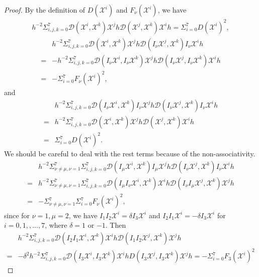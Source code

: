 \documentclass[10pt,a4paper]{amsart}
\numberwithin{equation}{section}
\begin{document}
\begin{proof}
By the definition of $D(\mathscr{X}^i)$ and $F_\nu(\mathscr{X}^i)$, we have
\begin{align*}
    h^{-2}\Sigma_{i,j,k=0}^7\mathcal{D}(\mathscr{X}^i,\mathscr{X}^k)\mathscr{X}^j h \mathcal{D}(\mathscr{X}^j,\mathscr{X}^k)\mathscr{X}^i h=\Sigma_{i=0}^7D(\mathscr{X}^i)^2,\end{align*}
\begin{align*}
    &h^{-2}\Sigma_{i,j,k=0}^7\mathcal{D}(\mathscr{X}^i,\mathscr{X}^k)\mathscr{X}^j h \mathcal{D}(I_\nu\mathscr{X}^j,\mathscr{X}^k)I_\nu\mathscr{X}^i h\\=&-h^{-2}\Sigma_{i,j,k=0}^7\mathcal{D}(I_\nu\mathscr{X}^i,I_\nu\mathscr{X}^k)\mathscr{X}^j h \mathcal{D}(I_\nu\mathscr{X}^j,I_\nu\mathscr{X}^k)\mathscr{X}^i h\\=&-\Sigma_{i=0}^7F_\nu(\mathscr{X}^i)^2,\end{align*}
and
\begin{align*}
    &h^{-2}\Sigma_{i,j,k=0}^7\mathcal{D}(I_\nu \mathscr{X}^i,\mathscr{X}^k)I_\nu\mathscr{X}^j h \mathcal{D}(I_\nu \mathscr{X}^j,\mathscr{X}^k)I_\nu\mathscr{X}^i h\\=& h^{-2}\Sigma_{i,j,k=0}^7\mathcal{D}(\mathscr{X}^i,\mathscr{X}^k)\mathscr{X}^j h \mathcal{D}(\mathscr{X}^j,\mathscr{X}^k)\mathscr{X}^i h\\=&\Sigma_{i=0}^7D(\mathscr{X}^i)^2.\end{align*}
We should be careful to deal with the rest terms because of the non-associativity.
\begin{align*}
    &h^{-2}\Sigma_{\nu\neq \mu,\nu=1}^7\Sigma_{i,j,k=0}^7\mathcal{D}(I_\mu \mathscr{X}^i,\mathscr{X}^k)I_\mu \mathscr{X}^j h \mathcal{D}(I_\nu\mathscr{X}^j,\mathscr{X}^k)I_\nu\mathscr{X}^i h\\=&h^{-2}\Sigma_{\nu\neq \mu,\nu=1}^7\Sigma_{i,j,k=0}^7\mathcal{D}(I_\mu I_\nu \mathscr{X}^i,\mathscr{X}^k) \mathscr{X}^i h \mathcal{D}(I_\nu I_\mu \mathscr{X}^j,\mathscr{X}^k)\mathscr{X}^j h\\=  
    &-\Sigma_{\nu\neq \mu, \nu=1}^7\Sigma_{i=0}^7F_\nu(\mathscr{X}^i)^2,\end{align*}
since for $\nu=1,\mu=2$,
we have $I_1I_2\mathscr{X}^i=\delta I_3\mathscr{X}^i$ and $I_2I_1\mathscr{X}^i=-\delta I_3\mathscr{X}^i$ for $i=0,1,,...,7$, where $\delta=1$ or $-1$. Then
\begin{align*}
&h^{-2}\Sigma_{i,j,k=0}^7\mathcal{D}(I_2 I_1 \mathscr{X}^i,\mathscr{X}^k) \mathscr{X}^i h \mathcal{D}(I_1 I_2 \mathscr{X}^j,\mathscr{X}^k)\mathscr{X}^j h\\=& -\delta^2h^{-2}\Sigma_{i,j,k=0}^7\mathcal{D}(I_3\mathscr{X}^i,I_3\mathscr{X}^k)\mathscr{X}^i hD(I_3\mathscr{X}^j,I_3\mathscr{X}^k)\mathscr{X}^jh=-\Sigma_{i=0}^7F_3(\mathscr{X}^i)^2
\end{align*}







\end{proof}
\end{document}
